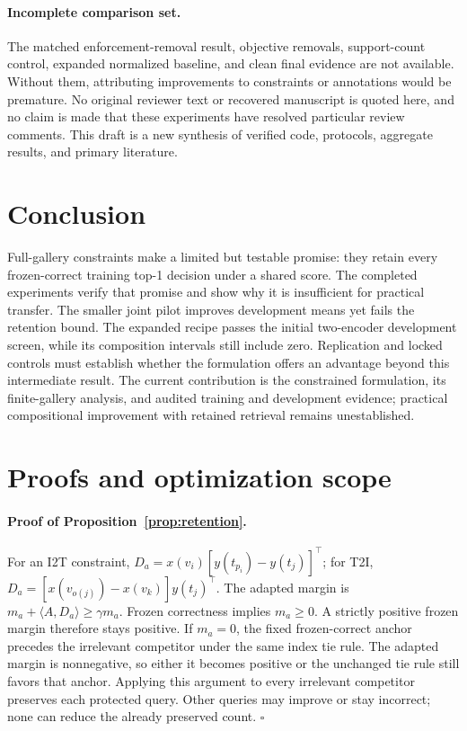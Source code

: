 \documentclass[11pt]{article}
\newcommand{\ip}[2]{\langle #1,#2\rangle}
\begin{document}
\paragraph{Incomplete comparison set.}
The matched enforcement-removal result, objective removals, support-count
control, expanded normalized baseline, and clean final evidence are not
available. Without them, attributing improvements to constraints or
annotations would be premature. No original reviewer text or recovered
manuscript is quoted here, and no claim is made that these experiments have
resolved particular review comments. This draft is a new synthesis of
verified code, protocols, aggregate results, and primary literature.

\section{Conclusion}
Full-gallery constraints make a limited but testable promise: they retain
every frozen-correct training top-1 decision under a shared score. The
completed experiments verify that promise and show why it is insufficient
for practical transfer. The smaller joint pilot improves development means
yet fails the retention bound. The expanded recipe passes the initial
two-encoder development screen, while its composition intervals still
include zero. Replication and locked controls must establish whether the
formulation offers an advantage beyond this intermediate result. The
current contribution is the constrained formulation, its finite-gallery
analysis, and audited training and development evidence; practical
compositional improvement with retained retrieval remains unestablished.

\appendix
\section{Proofs and optimization scope}\label{app:proof}
\paragraph{Proof of Proposition~\ref{prop:retention}.}
For an I2T constraint,
$D_a=x(v_i)[y(t_{p_i})-y(t_j)]^\top$; for T2I,
$D_a=[x(v_{o(j)})-x(v_k)]y(t_j)^\top$.
The adapted margin is $m_a+\ip{A}{D_a}\ge\gamma m_a$.
Frozen correctness implies $m_a\ge0$. A strictly positive frozen margin
therefore stays positive. If $m_a=0$, the fixed frozen-correct anchor
precedes the irrelevant competitor under the same index tie rule. The
adapted margin is nonnegative, so either it becomes positive or the
unchanged tie rule still favors that anchor. Applying this argument to
every irrelevant competitor preserves each protected query. Other
queries may improve or stay incorrect; none can reduce the already
preserved count. \hfill$\square$
\end{document}
